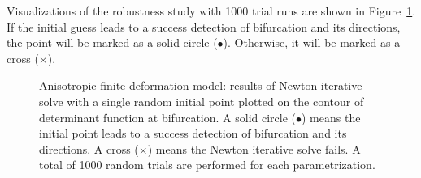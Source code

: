 \documentclass[12pt]{article}
\numberwithin{equation}{section}
\begin{document}
Visualizations of the robustness study with 1000 trial runs are shown
in Figure~\ref{fig:aniso_uniaxial_robust}. If the initial guess leads
to a success detection of bifurcation and its directions, the point
will be marked as a solid circle ($\bullet$). Otherwise, it will be
marked as a cross ($\times$).

\begin{figure}[H]
   \centering {}   
   \caption{Anisotropic finite deformation model: results of Newton
   iterative solve with a single random initial point plotted on the
   contour of determinant function at bifurcation. A solid circle
   ($\bullet$) means the initial point leads to a success detection of
   bifurcation and its directions. A cross ($\times$) means the Newton
   iterative solve fails. A total of 1000 random trials are performed
   for each parametrization.}
   \label{fig:aniso_uniaxial_robust}
 \end{figure}
\end{document}
